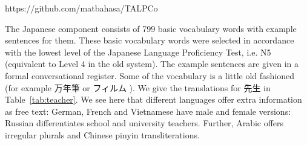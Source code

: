 \documentclass[11pt]{article}
\begin{document}
https://github.com/matbahasa/TALPCo

The Japanese component consists of 799 basic vocabulary words with
example sentences for them. These basic vocabulary words were selected
in accordance with the lowest level of the Japanese Language
Proficiency Test, i.e. N5 (equivalent to Level 4 in the old
system). The example sentences are given in a formal conversational
register.  Some of the vocabulary is a little old fashioned (for
example 万年筆  or フィルム 
).   We give the translations
for 先生  in Table~\ref{tab:teacher}.  We see
here that different languages offer extra information as free text: German, French and Vietnamese have male and
female versions: Russian differentiates school and university
teachers.  Further, Arabic offers irregular plurals and Chinese pinyin
transliterations.
\end{document}

